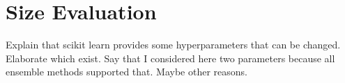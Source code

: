 \section{Size Evaluation}
Explain that scikit learn provides some hyperparameters that can be changed. Elaborate which exist.
Say that I considered here two parameters because all ensemble methods supported that. Maybe other reasons.


